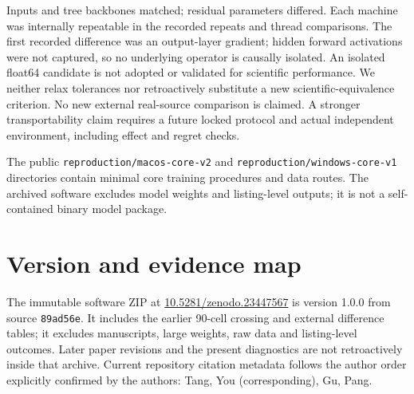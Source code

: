 \documentclass[11pt]{article}
\begin{document}
Inputs and tree backbones matched; residual parameters differed. Each machine
was internally repeatable in the recorded repeats and thread comparisons.
The first recorded difference was an output-layer gradient; hidden forward
activations were not captured, so no underlying operator is causally isolated.
An isolated float64 candidate is not adopted or validated for scientific
performance. We neither relax tolerances nor retroactively substitute a new
scientific-equivalence criterion. No new external real-source comparison is
claimed. A stronger transportability claim requires a future locked protocol
and actual independent environment, including effect and regret checks.

The public \texttt{reproduction/macos-core-v2} and
\texttt{reproduction/windows-core-v1} directories contain minimal core training
procedures and data routes. The archived software excludes model weights and
listing-level outputs; it is not a self-contained binary model package.

\section{Version and evidence map}
The immutable software ZIP at
\href{https://doi.org/10.5281/zenodo.23447567}{10.5281/zenodo.23447567}
is version 1.0.0 from source \texttt{89ad56e}. It includes the earlier
90-cell crossing and external difference tables; it excludes manuscripts,
large weights, raw data and listing-level outcomes. Later paper revisions
and the present diagnostics are not retroactively inside that archive.
Current repository citation metadata follows the author order explicitly
confirmed by the authors: Tang, You (corresponding), Gu, Pang.
\end{document}
